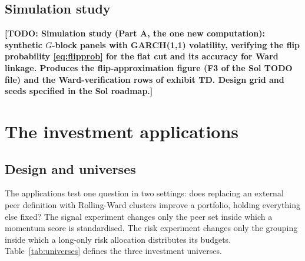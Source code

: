 \documentclass[11pt]{article}
\theoremstyle{remark}
\newcommand{\TODO}[1]{\textbf{[TODO: #1]}}
\begin{document}
\subsection{Simulation study}
\label{sec:simulation}

\TODO{Simulation study (Part A, the one new computation): synthetic
$G$-block panels with GARCH(1,1) volatility, verifying the flip probability
\eqref{eq:flipprob} for the flat cut and its accuracy for Ward linkage.
Produces the flip-approximation figure (F3 of the Sol TODO file) and the
Ward-verification rows of exhibit TD. Design grid and seeds specified in the
Sol roadmap.}

\section{The investment applications}
\label{sec:applications}

\subsection{Design and universes}
\label{sec:design}

The applications test one question in two settings: does replacing an external
peer definition with Rolling-Ward clusters improve a portfolio, holding
everything else fixed? The signal experiment changes only the peer set inside
which a momentum score is standardised. The risk experiment changes only the
grouping inside which a long-only risk allocation distributes its budgets.
Table~\ref{tab:universes} defines the three investment universes.
\end{document}
